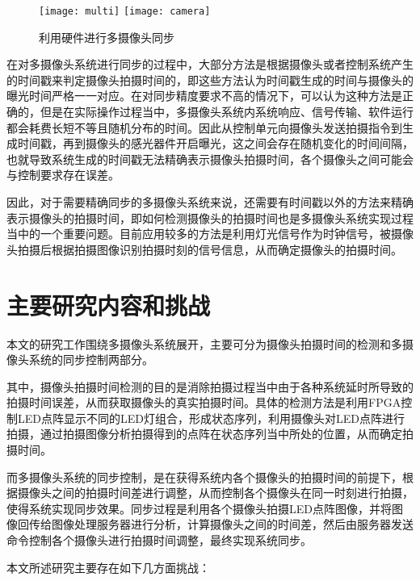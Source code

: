 \begin{figure}[h]
  \centering%
    {\texttt{[image: multi]}}
    \hspace{4em}%
      {\texttt{[image: camera]}}
  \caption{利用硬件进行多摄像头同步}
\end{figure}

在对多摄像头系统进行同步的过程中，大部分方法是根据摄像头或者控制系统产生的时间戳来判定摄像头拍摄时间的，即这些方法认为时间戳生成的时间与摄像头的曝光时间严格一一对应。在对同步精度要求不高的情况下，可以认为这种方法是正确的，但是在实际操作过程当中，多摄像头系统内系统响应、信号传输、软件运行都会耗费长短不等且随机分布的时间。因此从控制单元向摄像头发送拍摄指令到生成时间戳，再到摄像头的感光器件开启曝光，这之间会存在随机变化的时间间隔，也就导致系统生成的时间戳无法精确表示摄像头拍摄时间，各个摄像头之间可能会与控制要求存在误差。

因此，对于需要精确同步的多摄像头系统来说，还需要有时间戳以外的方法来精确表示摄像头的拍摄时间，即如何检测摄像头的拍摄时间也是多摄像头系统实现过程当中的一个重要问题。目前应用较多的方法是利用灯光信号作为时钟信号，被摄像头拍摄后根据拍摄图像识别拍摄时刻的信号信息，从而确定摄像头的拍摄时间。

\section{主要研究内容和挑战}

本文的研究工作围绕多摄像头系统展开，主要可分为摄像头拍摄时间的检测和多摄像头系统的同步控制两部分。

其中，摄像头拍摄时间检测的目的是消除拍摄过程当中由于各种系统延时所导致的拍摄时间误差，从而获取摄像头的真实拍摄时间。具体的检测方法是利用FPGA控制LED点阵显示不同的LED灯组合，形成状态序列，利用摄像头对LED点阵进行拍摄，通过拍摄图像分析拍摄得到的点阵在状态序列当中所处的位置，从而确定拍摄时间。

而多摄像头系统的同步控制，是在获得系统内各个摄像头的拍摄时间的前提下，根据摄像头之间的拍摄时间差进行调整，从而控制各个摄像头在同一时刻进行拍摄，使得系统实现同步效果。同步过程是利用各个摄像头拍摄LED点阵图像，并将图像回传给图像处理服务器进行分析，计算摄像头之间的时间差，然后由服务器发送命令控制各个摄像头进行拍摄时间调整，最终实现系统同步。

本文所述研究主要存在如下几方面挑战：

